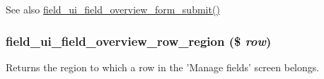 \begin{DoxySeeAlso}{See also}
\hyperlink{field__ui_8admin_8inc_ae8451ea140d864dd6c91fd9ac6703764}{field\_\-ui\_\-field\_\-overview\_\-form\_\-submit()} 
\end{DoxySeeAlso}
\hypertarget{field__ui_8admin_8inc_a1dc95804d73e042f77a0d2886f610d9b}{
\subsubsection[{field\_\-ui\_\-field\_\-overview\_\-row\_\-region}]{\setlength{\rightskip}{0pt plus 5cm}field\_\-ui\_\-field\_\-overview\_\-row\_\-region (\$ {\em row})}}
\label{field__ui_8admin_8inc_a1dc95804d73e042f77a0d2886f610d9b}
Returns the region to which a row in the 'Manage fields' screen belongs.


